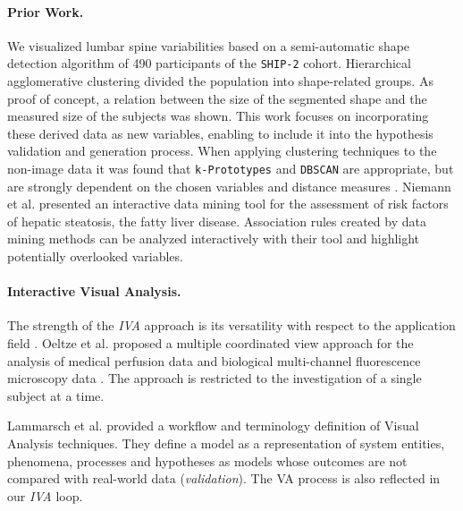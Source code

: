 \documentclass[journal]{style/vgtc} 			          %
\newcommand{\add}[1]{\textcolor{blue}{\uline{#1}}}
\begin{document}
\paragraph{Prior Work.}
We \cite{Klemm2013VMV} visualized lumbar spine variabilities based on a semi-automatic shape detection algorithm of 490 participants of the \texttt{SHIP-2} cohort.
%
Hierarchical agglomerative clustering divided the population into shape-related groups.
%
As proof of concept, a relation between the size of the segmented shape and the measured size of the subjects was shown.
%
This work focuses on incorporating these derived data as new variables, enabling to include it into the hypothesis validation and generation process.
%
When applying clustering techniques to the non-image data it was found that \texttt{k-Prototypes} and \texttt{DBSCAN} are appropriate, but are strongly dependent on the chosen variables and distance measures \cite{Klemm2014BVM}.
%
Niemann et al. \cite{Niemann2014} presented an interactive data mining tool for the assessment of risk factors of hepatic steatosis, the fatty liver disease.
%
Association rules created by data mining methods can be analyzed interactively with their tool and highlight potentially overlooked variables.
%

\paragraph{Interactive Visual Analysis.}
The strength of the \emph{IVA} approach is its versatility with respect to the application field \cite{Konyha2009}.
%
Oeltze et al. proposed a multiple coordinated view approach for the analysis of medical perfusion data \cite{Oeltze2007} and biological multi-channel fluorescence microscopy data \cite{Oeltze2011}.
%
The approach is restricted to the investigation of a single subject at a time.
%

Lammarsch et al. \cite{Lammarsch2011} provided a workflow and terminology definition of Visual Analysis techniques.
%
They define a model as a representation of system entities, phenomena, processes and hypotheses as models whose outcomes are not compared with real-world data (\emph{validation}).
%
The VA process is also reflected in our \emph{IVA} loop.
\end{document}
